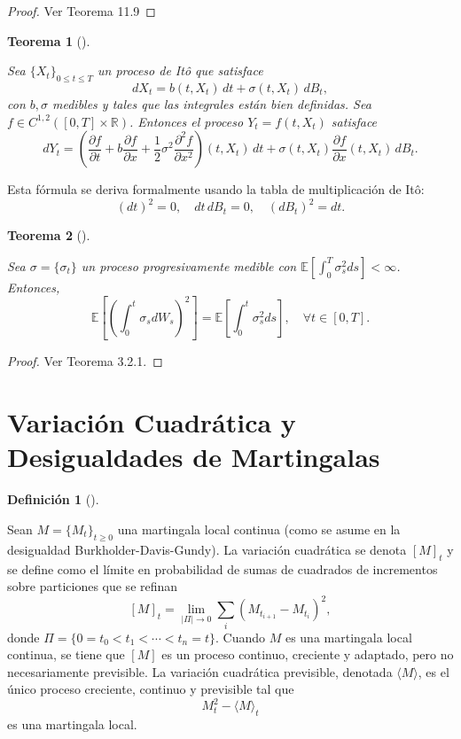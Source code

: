 \documentclass[
  spanish,
  us-letterpaper,
]{scrreprt}
\theoremstyle{plain}
\newtheorem{theorem}{Teorema}[chapter]
\theoremstyle{plain}
\theoremstyle{definition}
\newtheorem{definition}{Definición}[chapter]
\theoremstyle{remark}
\begin{document}
\begin{proof}
Ver \textcite{castaneda2012introduction} Teorema 11.9
\end{proof}

\begin{theorem}[]\protect\hypertarget{thm-Formula_ito_general}{}\label{thm-Formula_ito_general}

Sea \(\{X_t\}_{0 \leq t \leq T}\) un proceso de Itô que satisface
\[dX_t = b(t, X_t) \, dt + \sigma(t, X_t) \, dB_t,\] con \(b, \sigma\)
medibles y tales que las integrales están bien definidas. Sea
\(f \in C^{1,2}([0,T] \times \mathbb{R})\). Entonces el proceso
\(Y_t = f(t, X_t)\) satisface
\[dY_t = \left( \frac{\partial f}{\partial t} + b \frac{\partial f}{\partial x} + \frac{1}{2} \sigma^2 \frac{\partial^2 f}{\partial x^2} \right)(t, X_t) \, dt + \sigma(t, X_t) \frac{\partial f}{\partial x}(t, X_t) \, dB_t.\]

\end{theorem}

Esta fórmula se deriva formalmente usando la tabla de multiplicación de
Itô: \[(dt)^2 = 0, \quad dt\,dB_t = 0, \quad (dB_t)^2 = dt.\]

\begin{theorem}[]\protect\hypertarget{thm-Iso_Ito_continua}{}\label{thm-Iso_Ito_continua}

Sea \(\sigma = \{\sigma_t\}\) un proceso progresivamente medible con
\(\mathbb{E}[\int_0^T \sigma_s^2 ds] < \infty\). Entonces,
\[\mathbb{E}\left[ \left( \int_0^t \sigma_s dW_s \right)^2 \right] = \mathbb{E}\left[ \int_0^t \sigma_s^2 ds \right], \quad \forall t \in [0,T].\]

\end{theorem}

\begin{proof}
Ver \textcite{karatzas1991brownian} Teorema 3.2.1.
\end{proof}

\section{Variación Cuadrática y Desigualdades de
Martingalas}\label{variaciuxf3n-cuadruxe1tica-y-desigualdades-de-martingalas}

\begin{definition}[]\protect\hypertarget{def-variacion_cuadratica}{}\label{def-variacion_cuadratica}

Sean \(M = \{M_t\}_{t \geq 0}\) una martingala local continua (como se
asume en la desigualdad Burkholder-Davis-Gundy). La variación cuadrática
se denota \([M]_t\) y se define como el límite en probabilidad de sumas
de cuadrados de incrementos sobre particiones que se refinan
\[[M]_t = \lim_{|\Pi| \to 0} \sum_{i} (M_{t_{i+1}} - M_{t_i})^2,\] donde
\(\Pi = \{0 = t_0 < t_1 < \cdots < t_n = t\}\). Cuando \(M\) es una
martingala local continua, se tiene que \([M]\) es un proceso continuo,
creciente y adaptado, pero no necesariamente previsible. La variación
cuadrática previsible, denotada \(\langle M \rangle\), es el único
proceso creciente, continuo y previsible tal que
\[M_t^2 - \langle M \rangle_{t}\] es una martingala local.

\end{definition}
\end{document}
